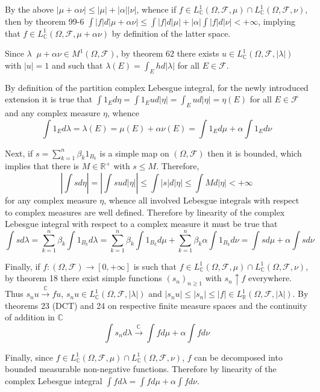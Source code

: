 \documentclass[a4paper]{article}
\newcommand{\clo}[1]{\left [ #1 \right ]}
\newcommand{\brac}[1]{\left ( #1 \right )}
\newcommand{\abs}[1]{\left | #1 \right |}
\newcommand{\Real}{\mathbb{R}}
\newcommand{\Zinf}{\clo{ 0, +\infty }}
\newcommand{\Cplx}{\mathbb{C}}
\newcommand{\Fcal}{\mathcal{F}}
\newcommand{\defn}{\mathop{\overset{\Delta}{=}}\nolimits}
\begin{document}
By the above $\abs{\mu + \alpha \nu}\leq \abs{\mu}+\abs{\alpha}\abs{\nu}$, whence if $f\in L^1_\Cplx\brac{\Omega, \Fcal, \mu}\cap L^1_\Cplx\brac{\Omega, \Fcal, \nu}$, then by theorem 99-6 $\int \abs{f} d\abs{\mu+\alpha \nu}\leq \int \abs{f} d\abs{\mu} + \abs{\alpha} \int \abs{f} d\abs{\nu} < +\infty$, implying that $f\in L^1_\Cplx\brac{\Omega, \Fcal, \mu+\alpha\nu}$ by definition of the latter space.

Since $\lambda\defn \mu + \alpha \nu \in M^1\brac{\Omega, \Fcal}$, by theorem 62 there exists $u\in L^1_\Cplx\brac{\Omega, \Fcal, \abs{\lambda}}$ with $\abs{u}=1$ and such that $\lambda\brac{E} = \int_E h d\abs{\lambda}$ for all $E\in \Fcal$.

By definition of the partition complex Lebesgue integral, for the newly introduced extension it is true that $\int 1_E d\eta = \int 1_E u d\abs{\eta} = \int_E u d\abs{\eta} = \eta\brac{E}$ for all $E\in \Fcal$ and any complex measure $\eta$, whence \[\int 1_E d\lambda = \lambda\brac{E} = \mu\brac{E} + \alpha \nu\brac{E} = \int 1_E d\mu + \alpha \int 1_E d\nu\]

Next, if $s=\sum_{k=1}^n \beta_k 1_{B_k}$ is a simple map on $\brac{\Omega, \Fcal}$ then it is bounded, which implies that there is $M\in \Real^+$ with $s\leq M$. Therefore, \[\abs{\int s d\eta} = \abs{\int s u d\abs{\eta}}\leq\int \abs{s} d\abs{\eta}\leq \int M d\abs{\eta}<+\infty\] for any complex measure $\eta$, whence all involved Lebesgue integrals with respect to complex measures are well defined. Therefore by linearity of the complex Lebesgue integral with respect to a complex measure it must be true that \[\int s d\lambda = \sum_{k=1}^n \beta_k \int 1_{B_k} d\lambda = \sum_{k=1}^n \beta_k \int 1_{B_k} d\mu + \sum_{k=1}^n \beta_k \alpha \int 1_{B_k} d\nu = \int s d\mu + \alpha \int s d\nu\]

Finally, if $f:\brac{\Omega, \Fcal}\to \Zinf$ is such that $f\in L^1_\Cplx\brac{\Omega, \Fcal, \mu}\cap L^1_\Cplx\brac{\Omega, \Fcal, \nu}$, by theorem 18 there exist simple functions $\brac{s_n}_{n\geq1}$ with $s_n\uparrow f$ everywhere. Thus $s_n u\overset{\Cplx}{\to} f u$, $s_n u\in L^1_\Cplx\brac{\Omega, \Fcal, \abs{\lambda}}$ and $\abs{s_n u}\leq \abs{s_n} \leq \abs{f}\in L^1_\Real\brac{\Omega, \Fcal, \abs{\lambda}}$. By theorems 23 (DCT) and 24 on respective finite measure spaces and the continuity of addition in $\Cplx$ \[\int s_n d\lambda \overset{\Cplx}{\to} \int f d\mu + \alpha \int f d\nu\]

Finally, since $f\in L^1_\Cplx\brac{\Omega, \Fcal, \mu}\cap L^1_\Cplx\brac{\Omega, \Fcal, \nu}$, $f$ can be decomposed into bounded measurable non-negative functions. Therefore by linearity of the complex Lebesgue integral $\int f d\lambda = \int f d\mu + \alpha \int f d\nu$.\\
\end{document}
